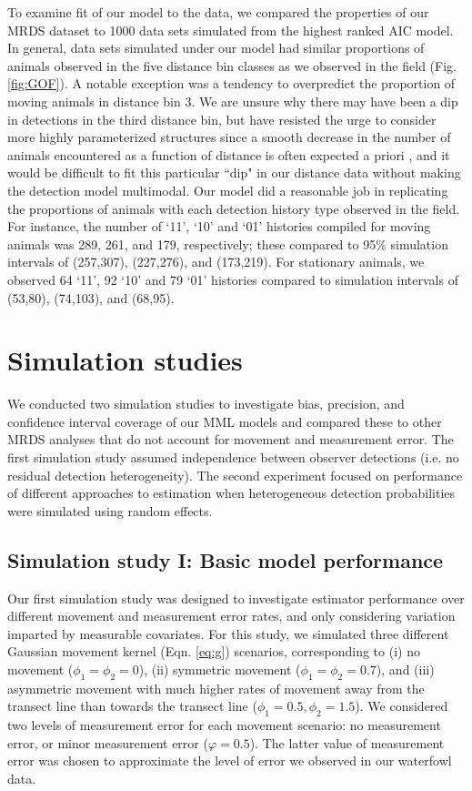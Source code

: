 \documentclass[aoas,preprint]{imsart}
\numberwithin{equation}{section}
\theoremstyle{plain}
\begin{document}
To examine fit of our model to the data, we compared the properties of our MRDS dataset to 1000 data sets simulated from the highest ranked AIC model.  In general, data sets simulated under our model had similar proportions of animals observed in the five distance bin classes as we observed in the field (Fig. \ref{fig:GOF}).  A notable exception was a tendency to overpredict the proportion of moving animals in distance bin 3.  We are unsure why there may have been a dip in detections in the third distance bin, but have resisted the urge to consider more highly parameterized structures since a smooth decrease in the number of animals encountered as a function of distance is often expected a priori \citep{BucklandEtAl2001}, and it would be difficult to fit this particular ``dip" in our distance data without making the detection model multimodal.  Our model did a reasonable job in replicating the proportions of animals with each detection history type observed in the field.  For instance, the number of `11', `10' and `01' histories compiled for moving animals was 289, 261, and 179, respectively; these compared to 95\% simulation intervals of (257,307), (227,276), and (173,219).  For stationary animals, we observed 64 `11', 92 `10' and 79 `01' histories compared to simulation intervals of (53,80), (74,103), and (68,95).


\section{Simulation studies}

We conducted two simulation studies to investigate bias, precision, and confidence interval coverage of our MML models and compared these to other MRDS analyses that do not account for movement and measurement error.  The first simulation study assumed independence between observer detections (i.e. no residual detection heterogeneity).  The second experiment focused on performance of different approaches to estimation when heterogeneous detection probabilities were simulated using random effects.

\subsection{Simulation study I: Basic model performance}

Our first simulation study was designed to investigate estimator performance over different movement and measurement error rates, and only considering variation imparted by measurable covariates.  For this study, we simulated  three different Gaussian movement kernel (Eqn. \ref{eq:g}) scenarios, corresponding to (i) no movement ($\phi_1 = \phi_2 = 0$), (ii) symmetric movement ($\phi_1 = \phi_2 = 0.7$), and (iii) asymmetric movement with much higher rates of movement away from the transect line than towards the transect line ($\phi_1 = 0.5, \phi_2 = 1.5$).  We considered two levels of measurement error for each movement scenario: no measurement error, or minor measurement error ($\varphi = 0.5$).  The latter value of measurement error was chosen to approximate the level of error we observed in our waterfowl data.
\end{document}
